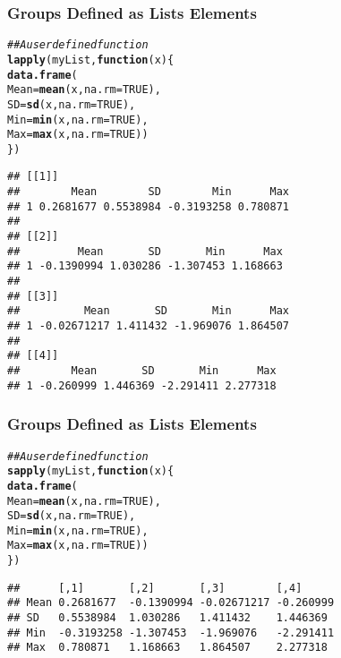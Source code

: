 \documentclass[paper=screen,mathserif]{beamer}\usepackage[]{graphicx}\usepackage[]{color}
\makeatletter
\newcommand{\hlnum}[1]{\textcolor[rgb]{0.686,0.059,0.569}{#1}}%
\newcommand{\hlcom}[1]{\textcolor[rgb]{0.678,0.584,0.686}{\textit{#1}}}%
\newcommand{\hlstd}[1]{\textcolor[rgb]{0.345,0.345,0.345}{#1}}%
\newcommand{\hlkwa}[1]{\textcolor[rgb]{0.161,0.373,0.58}{\textbf{#1}}}%
\newcommand{\hlkwc}[1]{\textcolor[rgb]{0.333,0.667,0.333}{#1}}%
\newcommand{\hlkwd}[1]{\textcolor[rgb]{0.737,0.353,0.396}{\textbf{#1}}}%
\newenvironment{kframe}{%
 \def\at@end@of@kframe{}%
 \ifinner\ifhmode%
  \def\at@end@of@kframe{\end{minipage}}%
  \begin{minipage}{\columnwidth}%
 \fi\fi%
 \def\FrameCommand##1{\hskip\@totalleftmargin \hskip-\fboxsep
 \colorbox{shadecolor}{##1}\hskip-\fboxsep
     \hskip-\linewidth \hskip-\@totalleftmargin \hskip\columnwidth}%
 \MakeFramed {\advance\hsize-\width
   \@totalleftmargin\z@ \linewidth\hsize
   \@setminipage}}%
 {\par\unskip\endMakeFramed%
 \at@end@of@kframe}
\newenvironment{knitrout}{}{} %
\newcommand{\ft}[1]{\frametitle{#1}}
\makeatother
\begin{document}
\begin{frame}[fragile]
  \ft{Groups Defined as Lists Elements}

\begin{knitrout}\tiny
{}\color{fgcolor}\begin{kframe}
\begin{alltt}
\hlcom{## A user defined function}
\hlkwd{lapply}\hlstd{(myList,} \hlkwa{function}\hlstd{(}\hlkwc{x}\hlstd{) \{}
    \hlkwd{data.frame}\hlstd{(}
        \hlkwc{Mean} \hlstd{=} \hlkwd{mean}\hlstd{(x,} \hlkwc{na.rm} \hlstd{=} \hlnum{TRUE}\hlstd{),}
        \hlkwc{SD} \hlstd{=} \hlkwd{sd}\hlstd{(x,} \hlkwc{na.rm} \hlstd{=} \hlnum{TRUE}\hlstd{),}
        \hlkwc{Min} \hlstd{=} \hlkwd{min}\hlstd{(x,} \hlkwc{na.rm} \hlstd{=} \hlnum{TRUE}\hlstd{),}
        \hlkwc{Max} \hlstd{=} \hlkwd{max}\hlstd{(x,} \hlkwc{na.rm} \hlstd{=} \hlnum{TRUE}\hlstd{))}
\hlstd{\})}
\end{alltt}
\begin{verbatim}
## [[1]]
##        Mean        SD        Min      Max
## 1 0.2681677 0.5538984 -0.3193258 0.780871
## 
## [[2]]
##         Mean       SD       Min      Max
## 1 -0.1390994 1.030286 -1.307453 1.168663
## 
## [[3]]
##          Mean       SD       Min      Max
## 1 -0.02671217 1.411432 -1.969076 1.864507
## 
## [[4]]
##        Mean       SD       Min      Max
## 1 -0.260999 1.446369 -2.291411 2.277318
\end{verbatim}
\end{kframe}
\end{knitrout}

\end{frame}

\begin{frame}[fragile]
  \ft{Groups Defined as Lists Elements}

\begin{knitrout}\scriptsize
{}\color{fgcolor}\begin{kframe}
\begin{alltt}
\hlcom{## A user defined function}
\hlkwd{sapply}\hlstd{(myList,} \hlkwa{function}\hlstd{(}\hlkwc{x}\hlstd{) \{}
    \hlkwd{data.frame}\hlstd{(}
        \hlkwc{Mean} \hlstd{=} \hlkwd{mean}\hlstd{(x,} \hlkwc{na.rm} \hlstd{=} \hlnum{TRUE}\hlstd{),}
        \hlkwc{SD} \hlstd{=} \hlkwd{sd}\hlstd{(x,} \hlkwc{na.rm} \hlstd{=} \hlnum{TRUE}\hlstd{),}
        \hlkwc{Min} \hlstd{=} \hlkwd{min}\hlstd{(x,} \hlkwc{na.rm} \hlstd{=} \hlnum{TRUE}\hlstd{),}
        \hlkwc{Max} \hlstd{=} \hlkwd{max}\hlstd{(x,} \hlkwc{na.rm} \hlstd{=} \hlnum{TRUE}\hlstd{))}
\hlstd{\})}
\end{alltt}
\begin{verbatim}
##      [,1]       [,2]       [,3]        [,4]     
## Mean 0.2681677  -0.1390994 -0.02671217 -0.260999
## SD   0.5538984  1.030286   1.411432    1.446369 
## Min  -0.3193258 -1.307453  -1.969076   -2.291411
## Max  0.780871   1.168663   1.864507    2.277318
\end{verbatim}
\end{kframe}
\end{knitrout}

\end{frame}
\end{document}
